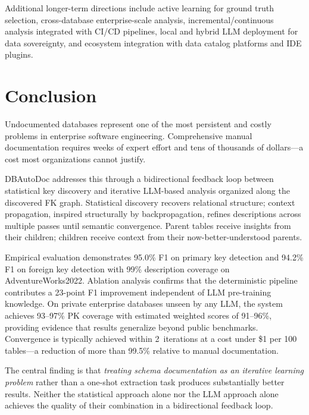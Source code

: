 \documentclass[twocolumn]{svjour3}
\begin{document}
Additional longer-term directions include active learning for ground truth selection, cross-database enterprise-scale analysis, incremental/continuous analysis integrated with CI/CD pipelines, local and hybrid LLM deployment for data sovereignty, and ecosystem integration with data catalog platforms and IDE plugins.


\section{Conclusion}\label{sec:conclusion}

Undocumented databases represent one of the most persistent and costly problems in enterprise software engineering. Comprehensive manual documentation requires weeks of expert effort and tens of thousands of dollars---a cost most organizations cannot justify.

DBAutoDoc addresses this through a bidirectional feedback loop between statistical key discovery and iterative LLM-based analysis organized along the discovered FK graph. Statistical discovery recovers relational structure; context propagation, inspired structurally by backpropagation, refines descriptions across multiple passes until semantic convergence. Parent tables receive insights from their children; children receive context from their now-better-understood parents.

Empirical evaluation demonstrates 95.0\% F1 on primary key detection and 94.2\% F1 on foreign key detection with 99\% description coverage on AdventureWorks2022. Ablation analysis confirms that the deterministic pipeline contributes a 23-point F1 improvement independent of LLM pre-training knowledge. On private enterprise databases unseen by any LLM, the system achieves 93--97\% PK coverage with estimated weighted scores of 91--96\%, providing evidence that results generalize beyond public benchmarks. Convergence is typically achieved within 2~iterations at a cost under \$1 per 100 tables---a reduction of more than 99.5\% relative to manual documentation.

The central finding is that \emph{treating schema documentation as an iterative learning problem} rather than a one-shot extraction task produces substantially better results. Neither the statistical approach alone nor the LLM approach alone achieves the quality of their combination in a bidirectional feedback loop.
\end{document}
